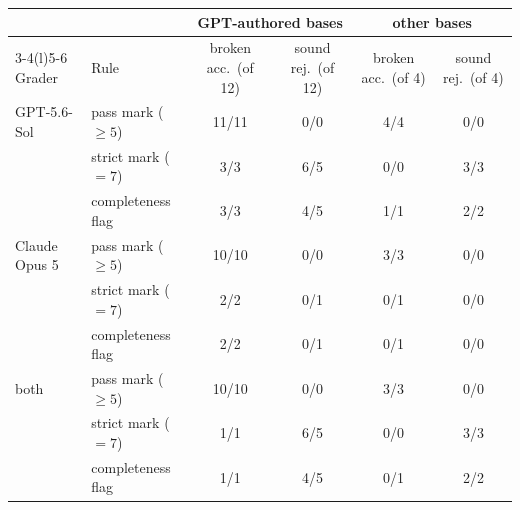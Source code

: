\begingroup\scriptsize\setlength{\tabcolsep}{4pt}
\begin{tabular}{@{}llcccc@{}}
\toprule
 & & \multicolumn{2}{c}{GPT-authored bases} & \multicolumn{2}{c}{other bases} \\
\cmidrule(lr){3-4}\cmidrule(l){5-6}
Grader & Rule & broken acc.\ (of 12) & sound rej.\ (of 12) & broken acc.\ (of 4) & sound rej.\ (of 4) \\
\midrule
GPT-5.6-Sol & pass mark ($\ge 5$) & 11/11 & 0/0 & 4/4 & 0/0 \\
 & strict mark ($=7$) & 3/3 & 6/5 & 0/0 & 3/3 \\
 & completeness flag & 3/3 & 4/5 & 1/1 & 2/2 \\
\midrule
Claude Opus 5 & pass mark ($\ge 5$) & 10/10 & 0/0 & 3/3 & 0/0 \\
 & strict mark ($=7$) & 2/2 & 0/1 & 0/1 & 0/0 \\
 & completeness flag & 2/2 & 0/1 & 0/1 & 0/0 \\
\midrule
both & pass mark ($\ge 5$) & 10/10 & 0/0 & 3/3 & 0/0 \\
 & strict mark ($=7$) & 1/1 & 6/5 & 0/0 & 3/3 \\
 & completeness flag & 1/1 & 4/5 & 0/1 & 2/2 \\
\bottomrule
\end{tabular}
\endgroup
